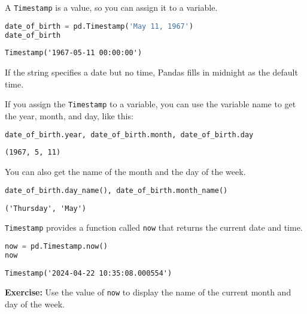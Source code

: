 A \passthrough{\lstinline!Timestamp!} is a value, so you can assign it
to a variable.

\begin{lstlisting}[language=Python,style=source]
date_of_birth = pd.Timestamp('May 11, 1967')
date_of_birth
\end{lstlisting}

\begin{lstlisting}[style=output]
Timestamp('1967-05-11 00:00:00')
\end{lstlisting}

If the string specifies a date but no time, Pandas fills in midnight as
the default time.

If you assign the \passthrough{\lstinline!Timestamp!} to a variable, you
can use the variable name to get the year, month, and day, like this:

\begin{lstlisting}[language=Python,style=source]
date_of_birth.year, date_of_birth.month, date_of_birth.day
\end{lstlisting}

\begin{lstlisting}[style=output]
(1967, 5, 11)
\end{lstlisting}

You can also get the name of the month and the day of the week.

\begin{lstlisting}[language=Python,style=source]
date_of_birth.day_name(), date_of_birth.month_name()
\end{lstlisting}

\begin{lstlisting}[style=output]
('Thursday', 'May')
\end{lstlisting}

\passthrough{\lstinline!Timestamp!} provides a function called
\passthrough{\lstinline!now!} that returns the current date and time.

\begin{lstlisting}[language=Python,style=source]
now = pd.Timestamp.now()
now
\end{lstlisting}

\begin{lstlisting}[style=output]
Timestamp('2024-04-22 10:35:08.000554')
\end{lstlisting}

\textbf{Exercise:} Use the value of \passthrough{\lstinline!now!} to
display the name of the current month and day of the week.

